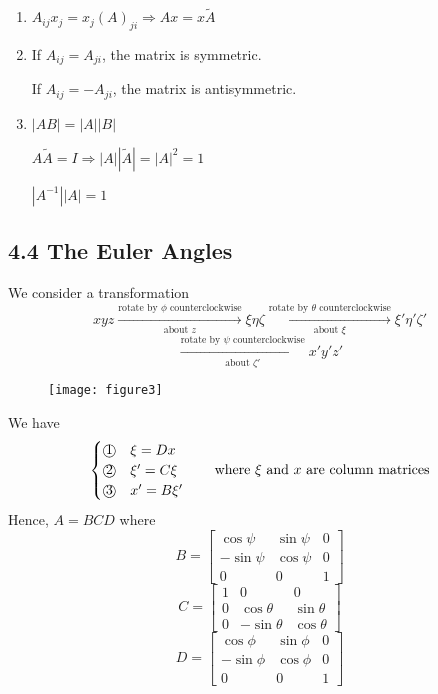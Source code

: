 \documentclass{article}
\begin{document}
\begin{enumerate}
		\item $A_{ij}x_j = x_j(A)_{ji} \Rightarrow Ax=x\tilde{A}$
		
		\item If $A_{ij} = A_{ji}$, the matrix is symmetric.
		
		If $A_{ij} = -A_{ji}$, the matrix is antisymmetric.
		
		\item $|AB|=|A||B|$
		
		$A\tilde{A}=I \Rightarrow |A||\tilde{A}| = |A|^2 = 1$
		
		$|A^{-1}||A|=1$
	\end{enumerate}
	
	\subsection*{4.4 The Euler Angles}
	We consider a transformation
	\[
	xyz \xrightarrow[\text{about } z]{\text{rotate by } \phi \text{ counterclockwise}} \xi\eta\zeta \xrightarrow[\text{about } \xi]{\text{rotate by } \theta \text{ counterclockwise}} \xi'\eta'\zeta'
	\]
	\[
	\xrightarrow[\text{about } \zeta']{\text{rotate by } \psi \text{ counterclockwise}} x'y'z'
	\]
	
	\begin{figure}[h]
		\centering
		\texttt{[image: figure3]}
		\caption{}
		\label{fig:figure3}
	\end{figure}
	
	
	We have
	\[
	\begin{cases}
		\text{\textcircled{1}} \quad \xi = Dx \\
		\text{\textcircled{2}} \quad \xi' = C\xi \\
		\text{\textcircled{3}} \quad x' = B\xi'
	\end{cases}
	\quad \text{where } \xi \text{ and } x \text{ are column matrices}
	\]
	Hence, $A=BCD$ where
	\[
	B = 
	\begin{bmatrix}
		\cos\psi & \sin\psi & 0 \\
		-\sin\psi & \cos\psi & 0 \\
		0 & 0 & 1
	\end{bmatrix}
	\]
	\[
	C = 
	\begin{bmatrix}
		1 & 0 & 0 \\
		0 & \cos\theta & \sin\theta \\
		0 & -\sin\theta & \cos\theta
	\end{bmatrix}
	\]
	\[
	D = 
	\begin{bmatrix}
		\cos\phi & \sin\phi & 0 \\
		-\sin\phi & \cos\phi & 0 \\
		0 & 0 & 1
	\end{bmatrix}
	\]
	
\end{document}

